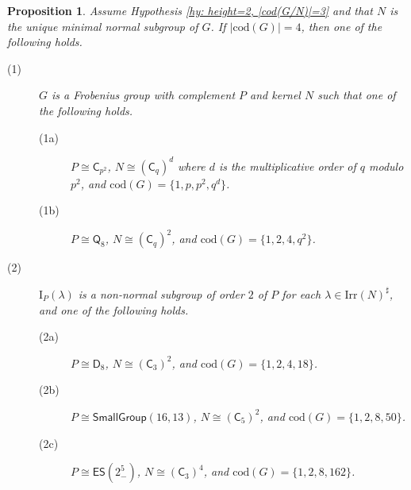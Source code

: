 \documentclass[9pt]{article}
\newtheorem{prop}[lem]{\bf Proposition}
\begin{document}
\begin{prop}\label{prop: height=2, |cod(G/N)|=3, N unique minimal normal}
	Assume Hypothesis \ref{hy: height=2, |cod(G/N)|=3} and that $N$ is the unique minimal normal subgroup of $G$.
	If $|\mathrm{cod}(G)|=4$, then one of the following holds.
	\begin{description}
		\item[(1)] $G$ is a Frobenius group with complement $P$ and kernel $N$ such that one of the following holds.
		 \begin{description}
			\item[(1a)] $P\cong \mathsf{C}_{p^{2}}$, $N\cong (\mathsf{C}_{q})^{d}$ where
			$d$ is the multiplicative order of $q$ modulo $p^{2}$,
			and $\mathrm{cod}(G)=\{ 1,p,p^{2},q^{d} \}$.
			\item[(1b)] $P\cong \mathsf{Q}_8$, $N\cong (\mathsf{C}_{q})^{2}$, and $\mathrm{cod}(G)=\{ 1,2,4,q^{2} \}$.
		 \end{description}
		 \item[(2)]
		 $\mathrm{I}_{P}(\lambda)$ is a non-normal subgroup of order $2$ of $P$ for each $\lambda \in \mathrm{Irr}(N)^\sharp$,
		 and one of the following holds.
		 \begin{description}
			\item[(2a)] $P\cong \mathsf{D}_{8}$, $N\cong (\mathsf{C}_{3})^{2}$, and $\mathrm{cod}(G)=\{ 1,2,4, 18 \}$.
			\item[(2b)] $P\cong\mathsf{SmallGroup}(16,13)$, $N\cong (\mathsf{C}_{5})^{2}$, and $\mathrm{cod}(G)=\{ 1,2,8,50 \}$.
			\item[(2c)] $P\cong \mathsf{ES}(2^{5}_{-})$, $N\cong (\mathsf{C}_{3})^{4}$, and $\mathrm{cod}(G)=\{ 1,2,8,162 \}$.
		 \end{description}
	\end{description}
\end{prop}
\end{document}
